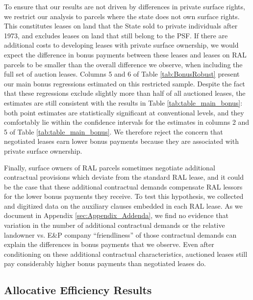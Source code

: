\documentclass[12pt]{article}
\begin{document}
To ensure that our results are not driven by differences in private surface rights, we restrict our analysis to parcels where the state does not own surface rights. This constitutes leases on land that the State sold to private individuals after 1973, and excludes leases on land that still belong to the PSF.  If there are additional costs to developing leases with private surface ownership, we would expect the difference in bonus payments between these leases and leases on RAL parcels to be smaller than the overall difference we observe, when including the full set of auction leases. Columns 5 and 6 of Table \ref{tab:BonusRobust} present our main bonus regressions estimated on this restricted sample. Despite the fact that these regressions exclude slightly more than half of all auctioned leases, the estimates are still consistent with the results in Table \ref{tab:table_main_bonus}: both point estimates are statistically significant at conventional levels, and they comfortably lie within the confidence intervals for the estimates in columns 2 and 5 of Table \ref{tab:table_main_bonus}.  We therefore reject the concern that negotiated leases earn lower bonus payments because they are associated with private surface ownership.

Finally, surface owners of RAL parcels sometimes negotiate additional contractual provisions which deviate from the standard RAL lease, and it could be the case that these additional contractual demands compensate RAL lessors for the lower bonus payments they receive.  To test this hypothesis, we collected and digitized data on the auxiliary clauses embedded in each RAL lease.  As we document in Appendix \ref{sec:Appendix_Addenda}, we find no evidence that variation in the number of additional contractual demands or the relative landowner vs. E\&P company ``friendliness'' of those contractual demands can explain the differences in bonus payments that we observe.   Even after conditioning on these additional contractual characteristics, auctioned leases still pay considerably higher bonus payments than negotiated leases do.

\subsection{Allocative Efficiency Results \label{sec:ResultsProductivity}}
\end{document}

